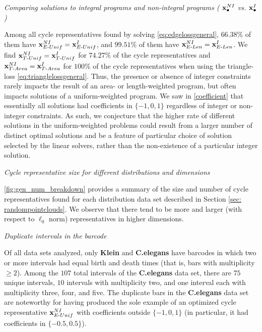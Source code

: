 \noindent \emph{Comparing solutions to  integral programs and non-integral programs ( $\mathbf{x}^{NI}_\bullet$ vs. $\mathbf{x}^{I}_{\bullet}$)}

Among all cycle representatives found by solving \pr \eqref{eq:edgelossgeneral}, $66.38\%$ of them have $\mathbf{x}^{NI}_{E\text{-}Unif} = \mathbf{x}^{I}_{E\text{-}Unif}$, and  $99.51\%$ of them have $\mathbf{x}^{NI}_{E\text{-}Len} = \mathbf{x}^{I}_{E\text{-}Len}$. We find $\mathbf{x}^{NI}_{T\text{-}Unif} = \mathbf{x}^{I}_{T\text{-}Unif}$ for $74.27\%$ of the cycle representatives and $\mathbf{x}^{NI}_{T\text{-}Area} = \mathbf{x}^{I}_{T\text{-}Area}$ for $100\%$ of the cycle representatives when using the triangle-loss \pr \eqref{eq:trianglelossgeneral}. Thus, the presence or absence of integer constraints rarely impacts the result of an area- or length-weighted program, but often impacts solutions of a uniform-weighted program. We saw in \se \ref{coefficient} that essentially all solutions had coefficients in $\{-1, 0, 1\}$ regardless of integer or non-integer constraints. As such, we conjecture that the higher rate of different solutions in the uniform-weighted problems could result from a larger number of distinct optimal solutions and be a feature of particular choice of solution selected by the linear solvers, rather than the non-existence of a particular integer solution.


\noindent \emph{Cycle representative size for different distributions and dimensions}

\fig \ref{fig:gen_num_breakdown} provides a summary of the size and number of cycle representatives found for each distribution data set described in Section \ref{sec: randompointclouds}. We observe that there tend to be more and larger (with respect to $\ell_0$ norm) representatives in higher dimensions.

\noindent \emph{Duplicate intervals in the barcode}
\label{duplicate intervals}

Of all data sets analyzed, only \textbf{Klein} and \textbf{C.elegans} have barcodes in which two or more intervals had equal birth and death times (that is, bars with multiplicity $\ge 2$). Among the $107$ total intervals of the \textbf{C.elegans} data set, there are $75$ unique intervals, $10$ intervals with multiplicity two, and one interval each with multiplicity three, four, and five. The duplicate bars in the \textbf{C.elegans} data set are noteworthy for having produced the sole example of an optimized cycle representative $\mathbf{x}^{NI}_{E\text{-}Unif}$ with coefficients outside $\{-1, 0, 1\}$ (in particular, it had coefficients in $\{-0.5, 0.5\}$). 

